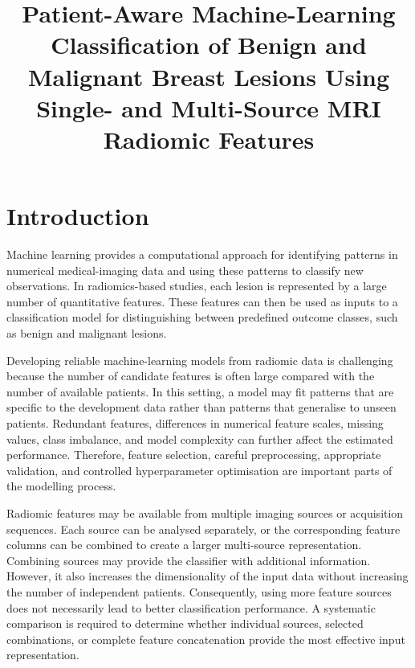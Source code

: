 \documentclass[12pt,twocolumn]{article}
\title{
    \textbf{
        Patient-Aware Machine-Learning Classification of Benign and Malignant Breast Lesions Using Single- and Multi-Source MRI Radiomic Features
    }
}
\date{}
\begin{document}
\maketitle




\begin{abstract}



\end{abstract}





\section{Introduction}
\label{sec:introduction}

Machine learning provides a computational approach for identifying patterns
in numerical medical-imaging data and using these patterns to classify new
observations. In radiomics-based studies, each lesion is represented by a
large number of quantitative features. These features can then be used as
inputs to a classification model for distinguishing between predefined
outcome classes, such as benign and malignant lesions.

Developing reliable machine-learning models from radiomic data is
challenging because the number of candidate features is often large compared
with the number of available patients. In this setting, a model may fit
patterns that are specific to the development data rather than patterns that
generalise to unseen patients. Redundant features, differences in numerical
feature scales, missing values, class imbalance, and model complexity can
further affect the estimated performance. Therefore, feature selection,
careful preprocessing, appropriate validation, and controlled
hyperparameter optimisation are important parts of the modelling process.

Radiomic features may be available from multiple imaging sources or
acquisition sequences. Each source can be analysed separately, or the
corresponding feature columns can be combined to create a larger
multi-source representation. Combining sources may provide the classifier
with additional information. However, it also increases the dimensionality
of the input data without increasing the number of independent patients.
Consequently, using more feature sources does not necessarily lead to better
classification performance. A systematic comparison is required to
determine whether individual sources, selected combinations, or complete
feature concatenation provide the most effective input representation.
\end{document}
